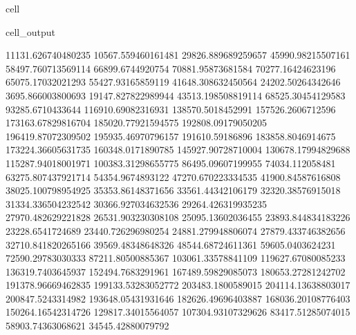 \documentclass[letterpaper,10pt,english]{jupyterBook}
\begin{document}
\begin{sphinxuseclass}{cell}
\begin{sphinxVerbatimOutput}
\begin{sphinxuseclass}{cell_output}
\begin{sphinxVerbatim}[commandchars=\\\{\}]
11131.626740480235  \PYGZhy{}10567.559460161481  \PYGZhy{}29826.889689259657  \PYGZhy{}45990.98215507161  \PYGZhy{}58497.760713569114  \PYGZhy{}66899.6744920754  \PYGZhy{}70881.95873681584  \PYGZhy{}70277.16424623196  \PYGZhy{}65075.17032021293  \PYGZhy{}55427.93165859119  \PYGZhy{}41648.308632450564  \PYGZhy{}24202.50264342646  \PYGZhy{}3695.866003800693  19147.827822989944  43513.198508819114  68525.30454129583  93285.6710433644  116910.69082316931  138570.5018452991  157526.2606712596  173163.67829816704  185020.77921594575  192808.09179050205  196419.87072309502  195935.46970796157  191610.59186896  183858.8046914675  173224.36605631735  160348.0171890785  145927.90728710004  130678.17994829688  115287.94018001971  100383.31298655775  86495.09607199955  74034.112058481  63275.807437921714  54354.9674893122  47270.670223334535  41900.84587616808  38025.100798954925  35353.86148371656  33561.44342106179  32320.38576915018  31334.336504232542  30366.927034632536  29264.426319935235  27970.482629221828  26531.903230308108  25095.13602036455  23893.844834183226  23228.6541724689  23440.726296980254  24881.279948806074  27879.433746382656  32710.841820265166  39569.48348648326  48544.68724611361  59605.0403624231  72590.29783030333  87211.80500885367  103061.33578841109  119627.67080085233  136319.7403645937  152494.7683291961  167489.59829085073  180653.27281242702  191378.96669462835  199133.53283052772  203483.1800589015  204114.13638803017  200847.5243314982  193648.05431931646  182626.49696403887  168036.20108776403  150264.16542314726  129817.34015564057  107304.93107329626  83417.51285074015  58903.74363068621  34545.42880079792  

\end{sphinxVerbatim}
\end{sphinxuseclass}
\end{sphinxVerbatimOutput}
\end{sphinxuseclass}
\end{document}
